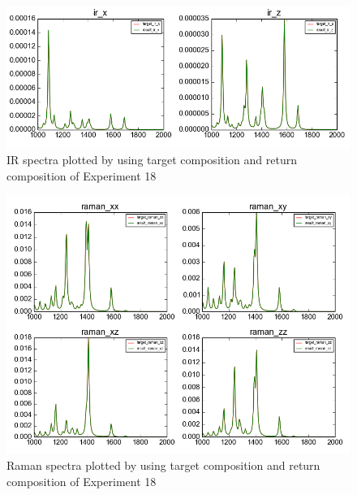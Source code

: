 \begin{figure}[!ht] \label{fig:4.5}
\centering
\includegraphics[scale=0.5]{Figures/chapter4_result_target_plotting_500datapoint_ir.png}
\caption{IR spectra plotted by using target composition and return composition of Experiment 18} 
\end{figure}

\begin{figure}[!ht] \label{fig:4.6}
\centering
\includegraphics[scale=0.5]{Figures/chapter4_result_target_plotting_500datapoint_raman.png}
\caption{Raman spectra plotted by using target composition and return composition of Experiment 18} 
\end{figure}

